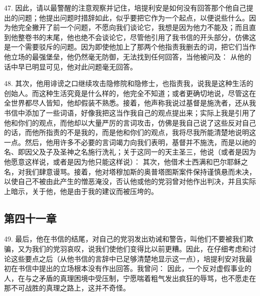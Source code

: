 47. 因此，请以最警醒的注意观察并记住，培提利安是如何没有回答那个他自己提出的问题；他提出问题时措辞如此，似乎要把它作为一个起点，以便说些什么。因为他完全撇开了前一个问题，不愿向我们谈论它，我想是因为他力不能及；而且直到他整卷书的末尾，他也绝不会谈论它，尽管他引用了我书信的开头部分，仿佛这是一个需要驳斥的问题。因为即使他加上了那两个他指责我删去的词，把它们当作他立场的最强堡垒，他仍然毫无防御，无法找到任何回答，当他被问及： 从他的话中早已明显可见，他对此问题毫无回答。\par

48. 其次，他用诽谤之口继续攻击隐修院和隐修士，也指责我，说我是这种生活的创始人。而这种生活究竟是什么样的，他完全不知道；或者更确切地说，尽管这在全世界都尽人皆知，他却假装不熟悉。接着，他声称我说过基督是施洗者，还从我书信中添加了一些词语，好像我把这当作我自己的观点提出来；实际上我是引用了他和你们的观点，而他却以大量严厉的言词攻击，仿佛是我自己说了这些反对自己的话，而他所指责的不是我的，而是他和你们的观点，我将尽我所能清楚地说明这一点。然后，他用许多不必要的言词竭力向我们表明，基督并不施洗，而是以祂的名、即因父及子及圣神之名施行洗礼；关于这同一的天主圣三，他说（或者是因为他愿意这样说，或者是因为他只能这样说）： 其次，他借术士西满和巴尔耶稣之名，对我们肆意谩骂。接着，他对塔穆加斯的奥普塔图斯案件保持谨慎悬而未决，以使自己不被由此产生的憎恶淹没，否认他或他的党羽曾对他作出判决，并且实际上暗示，关于他，他是由于我的建议而被压垮的。\par


\subsection{第四十一章}

49. 最后，他在书信的结尾，对自己的党羽发出劝诫和警告，叫他们不要被我们欺骗，又为我们的党羽哀叹，说我们使他们变得比以前更糟。因此，在仔细考虑和讨论这些要点之后（从他书信的言辞中已足够清楚地显示这一点），培提利安对我最初在书信中提出的立场根本没有作出回答。我曾问： 因此，一个反对虚假事业的人，在与之矛盾的真理困境中受压制，宁愿喘着粗气发出疯狂的辱骂，也不愿走在那不可战胜的真理之路上，这并不奇怪。\par

